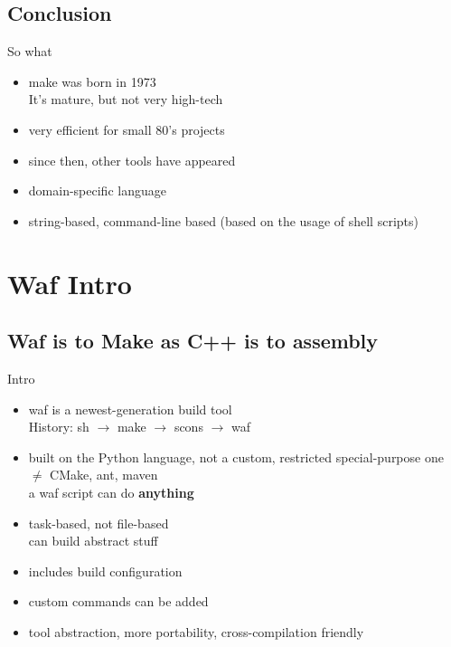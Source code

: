 \documentclass[xetex]{beamer}
\begin{document}
\subsection{Conclusion}

\begin{frame}{So what}
	\begin{itemize}
		\item make was born in 1973\\
		It's mature, but not very high-tech
		\item very efficient for small 80's projects
		\item since then, other tools have appeared
		\item domain-specific language
		\item string-based, command-line based (based on the usage of shell scripts)
	\end{itemize}
\end{frame}

\section{Waf Intro}


\subsection{Waf is to Make as C++ is to assembly}


\begin{frame}{Intro}
	\begin{itemize}
		\item waf is a newest-generation build tool\\
		History: sh $\to$ make $\to$ scons $\to$ waf
		\item built on the Python language, not a custom, restricted special-purpose one\\
		$\neq$ CMake, ant, maven\\
		a waf script can do \textbf{anything}
		\item task-based, not file-based\\
		can build abstract stuff
		\item includes build configuration
		\item custom commands can be added
		\item tool abstraction, more portability, cross-compilation friendly
	\end{itemize}
\end{frame}
\end{document}
